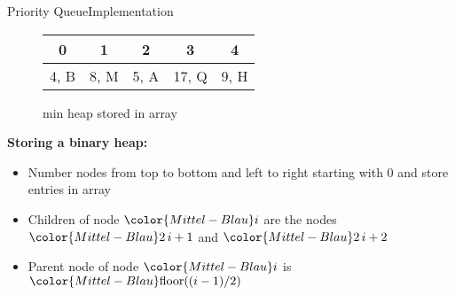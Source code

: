 \begin{frame}{Priority Queue}{Implementation}
 \begin{figure}[!h]%
   \vspace{-1.5em}
   \begin{minipage}[b]{0.4\linewidth}%
    \end{minipage}
    \hfill
    \begin{tabular}[b]{ccccc}
      {\color{Mittel-Gruen}0}&
      {\color{Mittel-Gruen}1}&
      {\color{Mittel-Gruen}2}&
      {\color{Mittel-Gruen}3}&
      {\color{Mittel-Gruen}4}\\
      \hline
      \multicolumn{1}{|c}{4, {\color{green2}B}}&%
      \multicolumn{1}{|c}{8, {\color{green2}M}}&%
      \multicolumn{1}{|c}{5, {\color{green2}A}}&%
      \multicolumn{1}{|c}{17, {\color{green2}Q}}&%
      \multicolumn{1}{|c|}{9, {\color{green2}H}}\\
      \hline
    \end{tabular}
    \vspace{-0.5em}
    \caption{min heap stored in array}%
    \label{fig:priority_queue:impl_min_heap}%
  \end{figure}%
 \vspace{-1.0em}
  \textbf{Storing a binary heap:}
  \begin{itemize}
    \item<3->
      Number nodes from top to bottom and left to right starting with 0
      and store entries in array
    \item<3->
      Children of node ${\color{Mittel-Blau}i}$ are the nodes
      ${\color{Mittel-Blau}2\,i+1}$ and ${\color{Mittel-Blau}2\,i+2}$
    \item<3->
      Parent node of node ${\color{Mittel-Blau}i}$ is
      $\displaystyle {\color{Mittel-Blau}\mathrm{floor}((i-1)/2)}$
  \end{itemize}
\end{frame}


